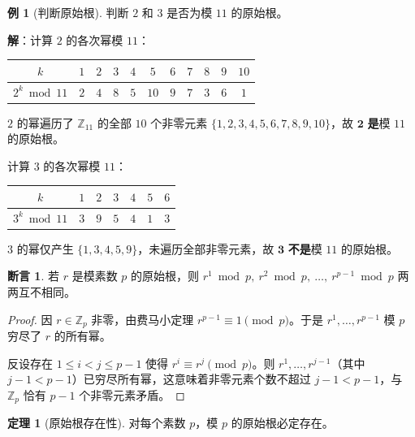 \documentclass[UTF8,11pt,a4paper]{ctexbook}   %
\theoremstyle{definition}
\newtheorem{theorem}{定理}[section]
\newtheorem{example}{例}[section]
\newtheorem{proposition}{断言}[section]
\begin{document}
\begin{example}[判断原始根]
判断 $2$ 和 $3$ 是否为模 $11$ 的原始根。

\textbf{解}：计算 $2$ 的各次幂模 $11$：
\begin{table}[htbp]
\centering
\begin{tabular}{|c|c|c|c|c|c|c|c|c|c|c|}
\hline
$k$ & $1$ & $2$ & $3$ & $4$ & $5$ & $6$ & $7$ & $8$ & $9$ & $10$ \\
\hline
$2^k \bmod 11$ & $2$ & $4$ & $8$ & $5$ & $10$ & $9$ & $7$ & $3$ & $6$ & $1$ \\
\hline
\end{tabular}
\end{table}

$2$ 的幂遍历了 $\mathbb{Z}_{11}$ 的全部 $10$ 个非零元素 $\{1,2,3,4,5,6,7,8,9,10\}$，故 $\mathbf{2}$ \textbf{是}模 $11$ 的原始根。

计算 $3$ 的各次幂模 $11$：
\begin{table}[htbp]
\centering
\begin{tabular}{|c|c|c|c|c|c|c|}
\hline
$k$ & $1$ & $2$ & $3$ & $4$ & $5$ & $6$ \\
\hline
$3^k \bmod 11$ & $3$ & $9$ & $5$ & $4$ & $1$ & $3$ \\
\hline
\end{tabular}
\end{table}

$3$ 的幂仅产生 $\{1,3,4,5,9\}$，未遍历全部非零元素，故 $\mathbf{3}$ \textbf{不是}模 $11$ 的原始根。
\end{example}

\begin{proposition}
若 $r$ 是模素数 $p$ 的原始根，则 $r^1 \bmod p,\ r^2 \bmod p,\ \ldots,\ r^{p-1} \bmod p$ 两两互不相同。
\end{proposition}

\begin{proof}
因 $r \in \mathbb{Z}_p$ 非零，由费马小定理 $r^{p-1} \equiv 1 \pmod{p}$。于是 $r^1,\ldots,r^{p-1}$ 模 $p$ 穷尽了 $r$ 的所有幂。

反设存在 $1 \le i < j \le p-1$ 使得 $r^i \equiv r^j \pmod{p}$。则 $r^1,\ldots,r^{j-1}$（其中 $j-1 < p-1$）已穷尽所有幂，这意味着非零元素个数不超过 $j-1 < p-1$，与 $\mathbb{Z}_p$ 恰有 $p-1$ 个非零元素矛盾。
\end{proof}

\begin{theorem}[原始根存在性]
对每个素数 $p$，模 $p$ 的原始根必定存在。
\end{theorem}
\end{document}

